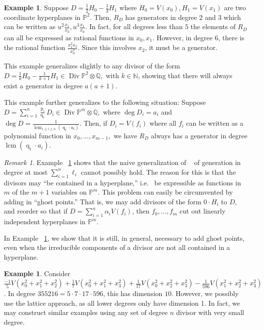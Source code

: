 \documentclass{amsart}
\theoremstyle{plain}
\theoremstyle{definition}
\newtheorem{example}[thm]{Example}
\theoremstyle{remark}
\newtheorem{rem}[thm]{Remark}
\numberwithin{equation}{section}
\newcommand\bn{{\mathbb N}}
\newcommand\bq{{\mathbb Q}}
\newcommand\bp{{\mathbb P}}
\DeclareMathOperator\di{Div}
\newcommand\bida{a}
\DeclareMathOperator{\num}{p}
\DeclareMathOperator{\den}{q}
\DeclareMathOperator{\lcm}{lcm}
\begin{document}
\begin{example}
\label{eg:hyperplane}
Suppose $D = \frac{1}{2}H_0 - \frac{1}{3}H_1$ where $H_0 = V(x_0),
H_1 = V(x_1)$ are two coordinate hyperplanes in $\bp^2$. Then, $R_D$
has generators in degree $2$ and $3$ which can be written as $u^2
\frac{x_1}{x_0}, u^3 \frac{x_1}{x_0}.$ In fact, for all degrees
less than $5$ the elements of $R_D$ can all be expressed as
rational functions in $x_0, x_1$. However, in degree $6$, there is
the rational function $\frac{x_1^2 x_2}{x_0^3}$. Since this
involves $x_2$, it must be a generator.

This example generalizes slightly to any divisor of the form $D =
\frac{1}{k}H_0 - \frac{1}{k+1}H_1 \in \di \bp^2 \otimes \bq,$ with
$k \in \bn$, showing that there will always exist a generator in
degree $a(a + 1)$.

This example further generalizes to the following situation:
Suppose $D = \sum_{i=1}^{n} \frac{\num_i}{\den_i}D_i \in \di \bp^m
\otimes \bq,$ where $\deg D_i = \bida_i$ and $\deg D = \frac{1}{\lcm
_{1 \leq i \leq n}(\den_i \cdot \bida_i)}$. Then, if $D_i = V(f_i)$
where all $f_i$ can be written as a polynomial function in $x_0,
\ldots, x_{m-1},$ we have $R_D$ always has a generator in degree
$\lcm(\den_i \cdot \bida_i)$.
\end{example}

\begin{rem}
\label{rem:ghost-motivation}
Example ~\ref{eg:hyperplane} shows that the naive generalization of
~\cite[Theorem 8]{dorney:canonical} of generation in degree at most
$\sum_{i=1}^{n}\ell_i$ cannot possibly hold. The reason for this is
that the divisors may ``be contained in a hyperplane,'' i.e.~ be
expressible as functions in $m$ of the $m+1$ variables on $\bp^m$.
This problem can easily be circumvented by adding in ``ghost
points.'' That is, we may add divisors of the form $0 \cdot H_i$ to
$D$, and reorder so that if $D = \sum_{i=1}^{n}\alpha_i V(f_i)$,
then $f_0, \ldots, f_m$ cut out linearly independent
hyperplanes in $\bp^m$.

In Example ~\ref{eg:radical}, we show that it is still, in general,
necessary to add ghost points, even when the irreducible components
of a divisor are not all contained in a hyperplane.
\end{rem}

\begin{example}
\label{eg:radical}
Consider $\frac{-1}{5}V(x_0^2 + x_1^2 + x_2^2) + \frac{1}{7}V(x_0^2 + x_1^2 +
x_3^2) + \frac{1}{17}V(x_0^2 + x_2^2 + x_3^2) - \frac{1}{596}V(x_1^2 + x_2^2 +
x_3^2)$. In degree $355216 = 5 \cdot 7 \cdot 17 \cdot 596$, this has dimension
$10$. 
However, we possibly use the lattice approach, as all lower degrees only have
dimension 1. In fact, we may construct similar examples using any set of degree
$n$ divisor with very small degree.
\end{example}
\end{document}
